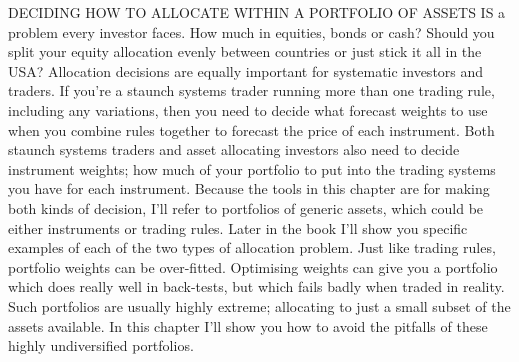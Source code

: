 

\begin{englishblock} DECIDING HOW TO ALLOCATE WITHIN A PORTFOLIO OF ASSETS IS a problem every investor faces. How much in equities, bonds or cash? Should you split your equity allocation evenly between countries or just stick it all in the USA? Allocation decisions are equally important for systematic investors and traders. If you're a staunch systems trader running more than one trading rule, including any variations, then you need to decide what forecast weights to use when you combine rules together to forecast the price of each instrument. Both staunch systems traders and asset allocating investors also need to decide instrument weights; how much of your portfolio to put into the trading systems you have for each instrument. Because the tools in this chapter are for making both kinds of decision, I'll refer to portfolios of generic assets, which could be either instruments or trading rules. Later in the book I'll show you specific examples of each of the two types of allocation problem. Just like trading rules, portfolio weights can be over-fitted. Optimising weights can give you a portfolio which does really well in back-tests, but which fails badly when traded in reality. Such portfolios are usually highly extreme; allocating to just a small subset of the assets available. In this chapter I'll show you how to avoid the pitfalls of these highly undiversified portfolios. \end{englishblock}

